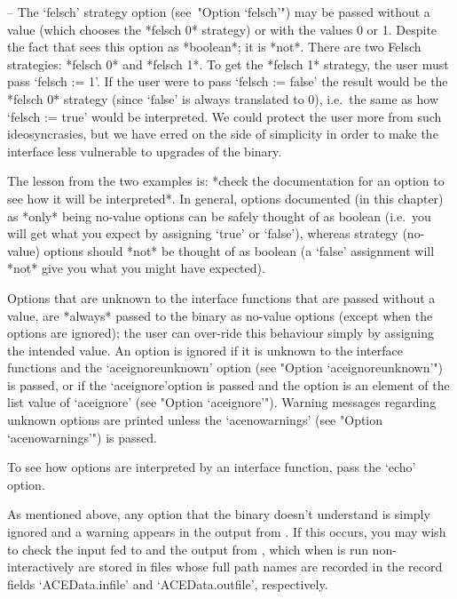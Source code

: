 \item{--} The `felsch' strategy option (see~"Option `felsch'") may  be
passed without a value (which chooses the *felsch 0* strategy) or with
the values 0 or 1. Despite the fact that {\GAP} sees  this  option  as
*boolean*; it is *not*. There are two Felsch  strategies:  *felsch  0*
and *felsch 1*. To get the *felsch 1* strategy,  the  user  must  pass
`felsch := 1'. If the user were to pass `felsch := false'  the  result
would be the *felsch 0* strategy (since `false' is  always  translated
to 0), i.e.~the same as how `felsch := true' would be interpreted.  We
could protect the user more from  such  ideosyncrasies,  but  we  have
erred on the side of simplicity in order to make  the  interface  less
vulnerable to upgrades of the {\ACE} binary.

\endlist

The lesson from the two examples is: *check the documentation  for  an
option to see  how  it  will  be  interpreted*.  In  general,  options
documented (in this chapter) as *only* being no-value options  can  be
safely thought of as boolean (i.e.~you will get  what  you  expect  by
assigning `true' or  `false'),  whereas  strategy  (no-value)  options
should *not* be thought of as boolean (a `false' assignment will *not*
give you what you might have expected).

Options that are unknown to the {\ACE} interface  functions  that  are
passed without a value, are *always* passed to the  {\ACE}  binary  as
no-value options (except when the options are ignored); the  user  can
over-ride this behaviour simply by assigning the  intended  value.  An
option is ignored if it is unknown to the {\ACE}  interface  functions
and the `aceignoreunknown' option (see "Option `aceignoreunknown'") is
passed, or if the `aceignore'option is passed and  the  option  is  an
element of the list value of `aceignore' (see  "Option  `aceignore'").
Warning messages regarding unknown  options  are  printed  unless  the
`acenowarnings' (see "Option `acenowarnings'") is passed.

To see how options are interpreted by an  {\ACE}  interface  function,
pass the `echo' option.

As  mentioned  above,  any  option  that  the  {\ACE}  binary  doesn't
understand is simply ignored and a warning appears in the output  from
{\ACE}. If this occurs, you may wish to check the input fed to  {\ACE}
and the output from {\ACE}, which when {\ACE} is run non-interactively
are stored in files whose full path names are recorded in  the  record
fields `ACEData.infile' and `ACEData.outfile', respectively.

